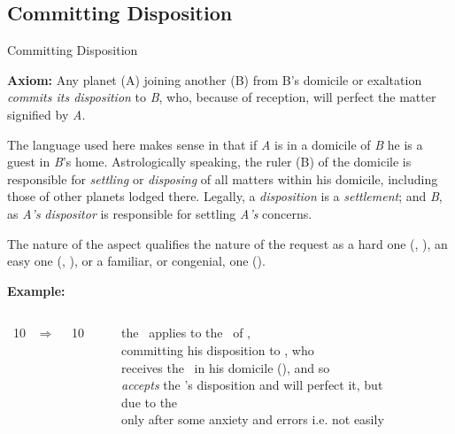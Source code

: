 \subsection{Committing Disposition}
\begin{frame}[t]{Committing Disposition}
\small
\begin{block}{}
\textbf{Axiom:} Any planet (A) joining another (B) from B's domicile or exaltation \textsl{commits its disposition} to \textsl{B}, who, because of reception, will perfect the matter signified by \textsl{A}.
\end{block}

The language used here makes sense in that if \textsl{A} is in a domicile of \textsl{B} he is a guest in \textsl{B}'s home. Astrologically speaking, the ruler (B) of the domicile is responsible for \textsl{settling} or \textsl{disposing} of all matters within his domicile, including those of other planets lodged there. Legally, a \textsl{disposition} is a \textsl{settlement}; and \textsl{B}, as \textsl{A's} \textsl{dispositor} is responsible for settling \textsl{A's} concerns.

The nature of the aspect qualifies the nature of the request as a hard one (\Square, \Opposition), an easy one (\Sextile, \Trine), or a familiar, or congenial, one (\Conjunction).

\textbf{Example:}
\begin{columns}[T, onlytextwidth]
\Sun\ 10 \Aries\ $\Rightarrow$ \Square\ \Mars\ 10 \Capricorn

\rule{.1mm}{.27\textheight}

the \Sun\ applies to the \Square\ of \Mars, \\
committing his disposition to \Mars, who  \\
receives the \Sun\ in his domicile (\Aries), and so \\
\textsl{accepts} the \Sun's disposition and will perfect it, but \\
due to the \Square\, \\ 
only after some anxiety and errors i.e. not easily
\end{columns}
\end{frame}
